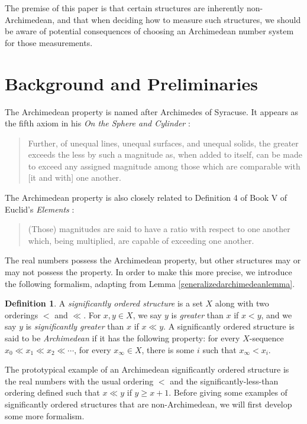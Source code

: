 \documentclass[reqno]{article}
\theoremstyle{definition}
\newtheorem{definition}{Definition}
\begin{document}
The premise of this paper is that certain structures are inherently
non-Archimedean, and that when deciding how to measure such structures,
we should be aware of potential consequences of choosing an
Archimedean number system for those measurements.


\section{Background and Preliminaries}

The Archimedean property is named after Archimedes of Syracuse.
It appears as the fifth axiom in his \emph{On the Sphere
and Cylinder} \cite{archimedes}:
\begin{quote}
    Further, of unequal lines, unequal surfaces, and unequal
    solids, the greater exceeds the less by such a magnitude
    as, when added to itself, can be made to exceed any
    assigned magnitude among those which are comparable with
    [it and with] one another.
\end{quote}
The Archimedean property is also closely related to Definition 4 of Book V of Euclid's
\emph{Elements} \cite{euclid}:
\begin{quote}
    (Those) magnitudes are said to have a ratio
    with respect to one another which, being
    multiplied, are capable of exceeding one
    another.
\end{quote}

The real numbers possess the Archimedean property, but other structures
may or may not possess the property. In order to make this more precise,
we introduce the following formalism, adapting from Lemma \ref{generalizedarchimedeanlemma}.

\begin{definition}
    A \emph{significantly ordered structure} is a set $X$ along with
    two orderings $<$ and $\ll$.
    For $x,y\in X$, we say $y$ is \emph{greater} than $x$ if $x<y$, and
    we say $y$ is \emph{significantly greater} than $x$ if $x\ll y$.
    A significantly ordered structure is said to be \emph{Archimedean} if it
    has the following property: for every $X$-sequence
    $x_0\ll x_1\ll x_2 \ll \cdots$,
    for every $x_\infty\in X$, there is some $i$ such that $x_\infty<x_i$.
\end{definition}

The prototypical example of an Archimedean significantly ordered structure is the real
numbers with the usual ordering $<$ and the significantly-less-than
ordering defined such that $x\ll y$ if $y\geq x+1$.
Before giving some examples of significantly ordered structures that are non-Archimedean,
we will first develop some more formalism.
\end{document}
